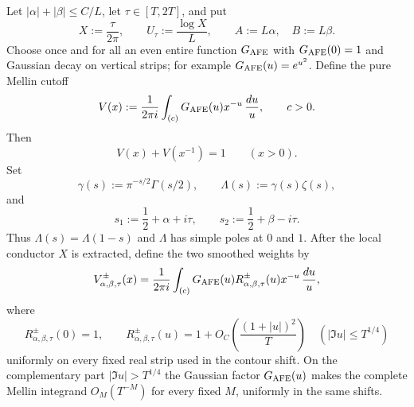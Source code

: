 \begin{lemma}
\label{lem:J-AFE-sharp-transfer}
Let $|\alpha|+|\beta|\le C/L$, let $\tau\in[T,2T]$, and put
\[
X:=\frac{\tau}{2\pi},
\qquad
U_\tau:=\frac{\log X}{L},
\qquad
A:=L\alpha,\quad B:=L\beta.
\]
Choose once and for all an even entire function $G_{\rm AFE}$ with
$G_{\rm AFE}(0)=1$ and Gaussian decay on vertical strips; for example
$G_{\rm AFE}(u)=e^{u^2}$.  Define the pure Mellin cutoff
\begin{equation}
V(x):=\frac1{2\pi i}\int_{(c)}G_{\rm AFE}(u)x^{-u}\,\frac{du}{u},
\qquad c>0.
\label{eq:pure-AFE-weight}
\end{equation}
Then
\begin{equation}
\boxed{V(x)+V(x^{-1})=1\qquad(x>0).}
\label{eq:AFE-complement}
\end{equation}
Set
\[
\gamma(s):=\pi^{-s/2}\Gamma(s/2),\qquad
\Lambda(s):=\gamma(s)\zeta(s),
\]
and
\[
s_1:=\frac12+\alpha+i\tau,\qquad
s_2:=\frac12+\beta-i\tau.
\]
Thus $\Lambda(s)=\Lambda(1-s)$ and $\Lambda$ has simple poles at $0$ and
$1$.  After the local conductor $X$ is extracted, define the two smoothed
weights by
\begin{equation}
V_{\alpha,\beta,\tau}^{\pm}(x)
=\frac1{2\pi i}\int_{(c)}G_{\rm AFE}(u)
 R_{\alpha,\beta,\tau}^{\pm}(u)x^{-u}\,\frac{du}{u},
\label{eq:exact-AFE-weights}
\end{equation}
where
\begin{equation}
R_{\alpha,\beta,\tau}^{\pm}(0)=1,
\qquad
R_{\alpha,\beta,\tau}^{\pm}(u)
=1+O_C\!\left(\frac{(1+|u|)^2}{T}\right)
\quad (|\Im u|\le T^{1/4})
\label{eq:AFE-gamma-ratio}
\end{equation}
uniformly on every fixed real strip used in the contour shift.  On the
complementary part $|\Im u|>T^{1/4}$ the Gaussian factor
$G_{\rm AFE}(u)$ makes the complete Mellin integrand $O_M(T^{-M})$ for every
fixed $M$, uniformly in the same shifts.


\end{lemma}

